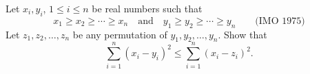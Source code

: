 Let $x_i, y_i$, $1 \leq i \leq n$ be real numbers such that
\[ x_1 \geq x_2 \geq \cdots \geq x_n \quad\text{and}\quad y_1 \geq y_2 \geq \cdots \geq y_n \qquad \text{(IMO 1975)} \]
Let $z_1, z_2, \ldots, z_n$ be any permutation of $y_1, y_2, \ldots, y_n$. Show that
\[ \sum_{i=1}^n (x_i - y_i)^2 \leq \sum_{i=1}^n (x_i - z_i)^2. \]
